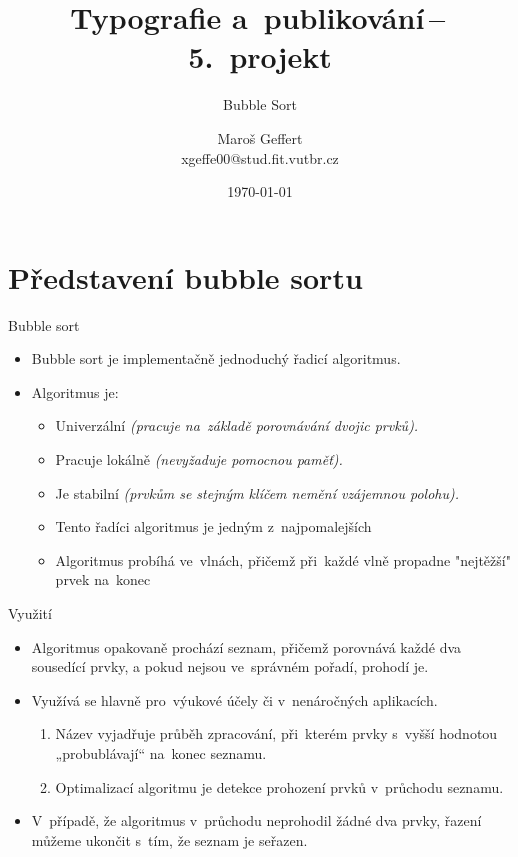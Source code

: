\documentclass[10pt, hyperref={unicode}]{beamer}
\title{Typografie a~publikování\,--\,5.~projekt}
\subtitle{Bubble Sort}
\author{Maroš Geffert\texorpdfstring{\\ xgeffe00@stud.fit.vutbr.cz}{}}
\date{\today}
\institute
{
	Vysoké učení technické v~Brně\\
	Fakulta informačních technologií
}
\begin{document}
\maketitle

\section{Představení bubble sortu}

\begin{frame}{Bubble sort}
	\begin{itemize}
		\item
		    \alert{Bubble sort} je implementačně jednoduchý řadicí algoritmus.
		    \pause
		\item
			Algoritmus je: 
			\begin{itemize}
			    \pause
				\item Univerzální \textit{(pracuje na~základě porovnávání dvojic prvků).}
				\pause
				\item Pracuje lokálně \textit{(nevyžaduje pomocnou paměť).}
				\pause
				\item Je stabilní \textit{(prvkům se stejným klíčem nemění vzájemnou polohu).}
				\pause
				\item Tento řadíci algoritmus je jedným z~najpomalejších
				\pause
				\item Algoritmus probíhá ve~vlnách, přičemž při~každé vlně propadne "nejtěžší" prvek na~konec
			\end{itemize}
	\end{itemize}
\end{frame}


\begin{frame}{Využití}
	\begin{itemize}
		\item
			Algoritmus opakovaně prochází seznam, přičemž porovnává každé dva sousedící prvky, a pokud nejsou ve~správném pořadí, prohodí je. 
		\item	
			Využívá se hlavně pro~výukové účely či v~nenáročných aplikacích. 
			\begin{enumerate}
				\item Název vyjadřuje průběh zpracování, při~kterém prvky s~vyšší hodnotou „probublávají“ na~konec seznamu. 
				\item Optimalizací algoritmu je detekce prohození prvků v~průchodu seznamu. 
			\end{enumerate}

		\item
			V~případě, že algoritmus v~průchodu neprohodil žádné dva prvky, řazení můžeme ukončit s~tím, že seznam je seřazen. 
	\end{itemize}
\end{frame}
\end{document}
